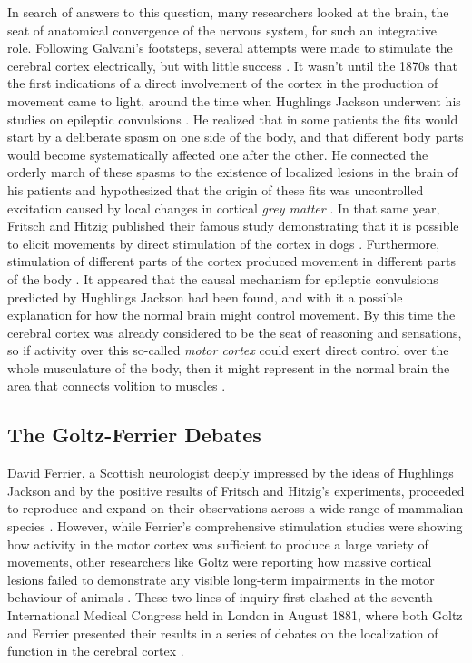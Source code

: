 In search of answers to this question, many researchers looked at the brain, the seat of anatomical convergence of the nervous system, for such an integrative role. Following Galvani's footsteps, several attempts were made to stimulate the cerebral cortex electrically, but with little success \cite{Gross2007}. It wasn't until the 1870s that the first indications of a direct involvement of the cortex in the production of movement came to light, around the time when Hughlings Jackson underwent his studies on epileptic convulsions \cite{Jackson1870}. He realized that in some patients the fits would start by a deliberate spasm on one side of the body, and that different body parts would become systematically affected one after the other. He connected the orderly march of these spasms to the existence of localized lesions in the brain of his patients and hypothesized that the origin of these fits was uncontrolled excitation caused by local changes in cortical \emph{grey matter} \cite{Jackson1870}. In that same year, Fritsch and Hitzig published their famous study demonstrating that it is possible to elicit movements by direct stimulation of the cortex in dogs \cite{Fritsch1870}. Furthermore, stimulation of different parts of the cortex produced movement in different parts of the body \cite{Fritsch1870}. It appeared that the causal mechanism for epileptic convulsions predicted by Hughlings Jackson had been found, and with it a possible explanation for how the normal brain might control movement. By this time the cerebral cortex was already considered to be the seat of reasoning and sensations, so if activity over this so-called \emph{motor cortex} could exert direct control over the whole musculature of the body, then it might represent in the normal brain the area that connects volition to muscles \cite{Fritsch1870}.

\subsection{The Goltz-Ferrier Debates}

David Ferrier, a Scottish neurologist deeply impressed by the ideas of Hughlings Jackson and by the positive results of Fritsch and Hitzig's experiments, proceeded to reproduce and expand on their observations across a wide range of mammalian species \cite{Ferrier1873}. However, while Ferrier's comprehensive stimulation studies were showing how activity in the motor cortex was sufficient to produce a large variety of movements, other researchers like Goltz were reporting how massive cortical lesions failed to demonstrate any visible long-term impairments in the motor behaviour of animals \cite{Goltz1888}. These two lines of inquiry first clashed at the seventh International Medical Congress held in London in August 1881, where both Goltz and Ferrier presented their results in a series of debates on the localization of function in the cerebral cortex \cite{Tyler2000}.

